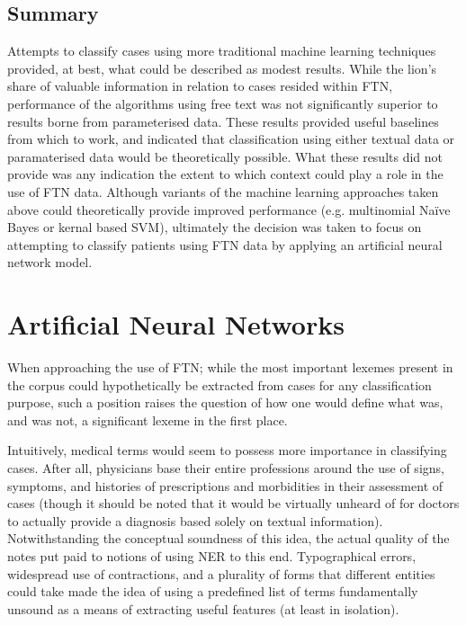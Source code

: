 \subsection{Summary}
\label{C}

Attempts to classify cases using more traditional machine learning techniques provided, at best, what could be described as modest results. While the lion's share of valuable information in relation to cases resided within FTN, performance of the algorithms using free text was not significantly superior to results borne from parameterised data. These results provided useful baselines from which to work, and indicated that classification using either textual data or paramaterised data would be theoretically possible. What these results did not provide was any indication the extent to which context could play a role in the use of FTN data. Although variants of the machine learning approaches taken above could theoretically provide improved performance (e.g. multinomial Naïve Bayes \cite{meftouh2019smart} or kernal based SVM), ultimately the decision was taken to focus on attempting to classify patients using FTN data by applying an artificial neural network model.



\section{Artificial Neural Networks}
\label{section:ANN-(theory)}
When approaching the use of FTN; while the most important lexemes present in the corpus could hypothetically be extracted from cases for any classification purpose, such a position raises the question of how one would define what was, and was not, a significant lexeme in the first place. 

Intuitively, medical terms would seem to possess more importance in classifying cases. After all, physicians base their entire professions around the use of signs, symptoms, and histories of prescriptions and morbidities in their assessment of cases (though it should be noted that it would be virtually unheard of for doctors to actually provide a diagnosis based solely on textual information). Notwithstanding the conceptual soundness of this idea, the actual quality of the notes put paid to notions of using NER to this end. Typographical errors, widespread use of contractions, and a plurality of forms that different entities could take made the idea of using a predefined list of terms fundamentally unsound as a means of extracting useful features (at least in isolation).

